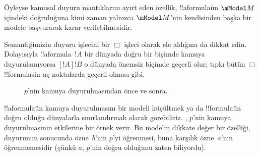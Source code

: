 \begin{defn}
\begin{enumerate}
  \end{enumerate} 
\end{defn}

Öyleyse kamusal duyuru mantıklarını ayırt eden özellik, !!a{formula}{}ün
$\mModel M$ içindeki doğruluğuna kimi zaman yalnızca $\mModel M$'nin
kendisinden başka bir modele başvurarak karar verilebilmesidir.

Semantiğimizin duyuru işlecini bir $\Box$ işleci olarak ele aldığına da dikkat
edin. Dolayısıyla !!a{formula}~$!A$ bir dünyada doğru bir biçimde kamuya
duyurulamıyorsa $[!A]!B$ o dünyada önemsiz biçimde geçerli olur; tıpkı bütün
$\Box$ !!{formula}s{}in uç noktalarda geçerli olması gibi.

\begin{figure}
  \begin{center}
  \end{center}
  \caption{$p$'nin kamuya duyurulmasından önce ve sonra.}
\end{figure}

!!a{formula}{}ün kamuya duyurulmasını bir modeli küçültmek ya da !!{formula}{}ün
doğru olduğu dünyalarla sınırlandırmak olarak görebiliriz.
, $p$'nin kamuya duyurulmasının etkilerine bir
örnek verir. Bu modelin dikkate değer bir özelliği, duyurunun sonucunda
özne~$b$'nin $p$'yi öğrenmesi, buna karşılık özne~$a$'nın öğrenmemesidir
(çünkü $a$, $p$'nin doğru olduğunu zaten biliyordu).

